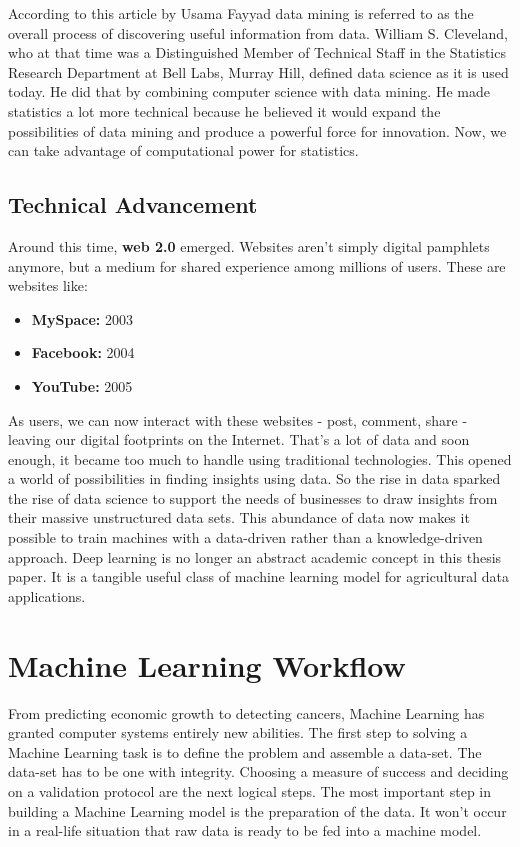 \documentclass[
]{thesis-ekf}
\begin{document}
According to this article by Usama Fayyad \cite{fayyad1996data} data mining is referred to  as the overall process of discovering useful information from data. William S. Cleveland, \cite{cleveland2001data}   who at that time was a Distinguished Member of Technical Staff in the Statistics Research Department at Bell Labs, Murray Hill, defined data science as it is used today. He did that by combining computer science with data mining. He made statistics a lot more technical because he believed it would expand the possibilities of data mining and produce a powerful force for innovation. Now, we can take advantage of computational power for statistics.

\subsection{Technical Advancement}
Around this time, \textbf{web 2.0} emerged. Websites aren't simply digital pamphlets anymore, but a medium for shared experience among millions of users. These are websites like:
\begin{itemize}
	\item \textbf{MySpace:} 2003
	\item \textbf{Facebook:} 2004
	\item \textbf{YouTube:} 2005	
\end{itemize}

As users, we can now interact with these websites - post, comment, share - leaving our digital footprints on the Internet. That's a lot of data and soon enough, it became too much to handle using traditional technologies. This opened a world of possibilities in finding insights using data. So the rise in data sparked the rise of data science to support the needs of businesses to draw insights from their massive unstructured data sets. This abundance of data now makes it possible to train machines with a data-driven rather than a knowledge-driven approach. Deep learning is no longer an abstract academic concept in this thesis paper. It is a tangible useful class of machine learning model for agricultural data applications.

\section{Machine Learning Workflow}
From predicting economic growth to detecting cancers, Machine Learning has granted computer systems entirely new abilities. The first step to solving a Machine Learning task is to define the problem and assemble a data-set. The data-set has to be one with integrity. Choosing a measure of success and deciding on a validation protocol are the next logical steps. The most important step in building a Machine Learning model is the preparation of the data. It won't occur in a real-life situation that raw data is ready to be fed into a machine model. 
\end{document}
